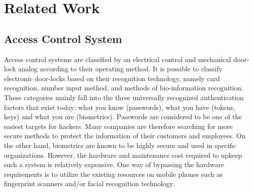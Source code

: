 \documentclass[conference]{IEEEtran}
\begin{document}
\section{Related Work}
\subsection{Access Control System}
	Access control systems are classified by an electrical control and mechanical door-lock analog according to their operating method. It is possible to classify electronic door-locks based on their recognition technology, namely card recognition, number input method, and methods of bio-information recognition. These categories mainly fall into the three universally recognized authentication factors that exist today: what you know (passwords), what you have (tokens, keys) and what you are (biometrics). 
Passwords are considered to be one of the easiest targets for hackers. Many companies are therefore searching for more secure methods to protect the information of their customers and employees. On the other hand, biometrics are known to be highly secure and used in specific organizations. However, the hardware and maintenance cost required to upkeep such a system is relatively expensive. One way of bypassing the hardware requirements is to utilize the existing resources on mobile phones such as fingerprint scanners and/or facial recognition technology.
\end{document}
